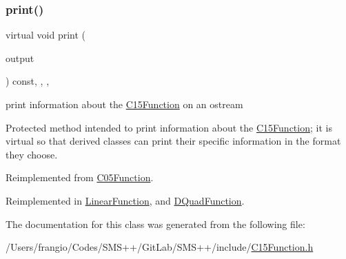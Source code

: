 \subsubsection{\texorpdfstring{print()}{print()}}
{\footnotesize\ttfamily virtual void print (\begin{DoxyParamCaption}\item[{std\+::ostream \&}]{output }\end{DoxyParamCaption}) const\hspace{0.3cm}{\ttfamily [inline]}, {\ttfamily [override]}, {\ttfamily [protected]}, {\ttfamily [virtual]}}



print information about the \mbox{\hyperlink{class_s_m_spp__di__unipi__it_1_1_c15_function}{C15\+Function}} on an ostream 

Protected method intended to print information about the \mbox{\hyperlink{class_s_m_spp__di__unipi__it_1_1_c15_function}{C15\+Function}}; it is virtual so that derived classes can print their specific information in the format they choose. 

Reimplemented from \mbox{\hyperlink{class_s_m_spp__di__unipi__it_1_1_c05_function_a59a9fcbf8f9f86d348344b2073644b0e}{C05\+Function}}.



Reimplemented in \mbox{\hyperlink{class_s_m_spp__di__unipi__it_1_1_linear_function_a87f6fa05f41e6d6f00fc4e0b12321abc}{Linear\+Function}}, and \mbox{\hyperlink{class_s_m_spp__di__unipi__it_1_1_d_quad_function_a4e1f59c2589efba7c429a92661a1f288}{D\+Quad\+Function}}.



The documentation for this class was generated from the following file\+:\begin{DoxyCompactItemize}
\item 
/\+Users/frangio/\+Codes/\+S\+M\+S++/\+Git\+Lab/\+S\+M\+S++/include/\mbox{\hyperlink{_c15_function_8h}{C15\+Function.\+h}}\end{DoxyCompactItemize}

